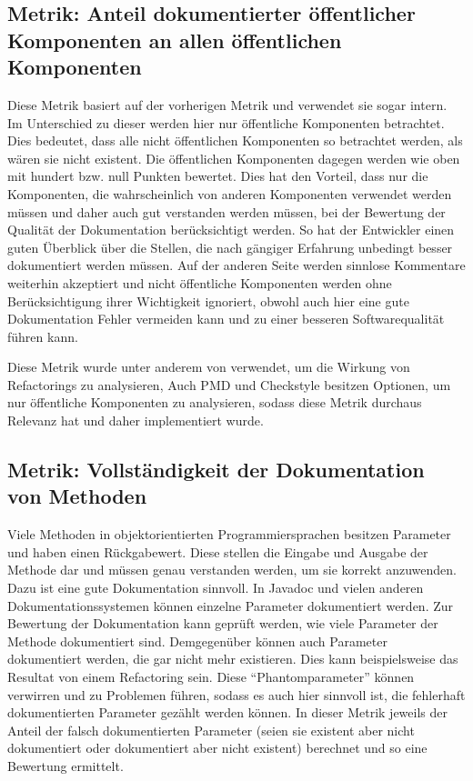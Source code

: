\subsection{Metrik: Anteil dokumentierter öffentlicher Komponenten an allen öffentlichen Komponenten }
Diese Metrik basiert auf der vorherigen Metrik und verwendet sie sogar intern. Im Unterschied zu dieser werden hier nur öffentliche Komponenten betrachtet. Dies bedeutet, dass alle nicht öffentlichen Komponenten so betrachtet werden, als wären sie nicht existent. Die öffentlichen Komponenten dagegen werden wie oben mit hundert bzw. null Punkten bewertet. Dies hat den Vorteil, dass nur die Komponenten, die wahrscheinlich von anderen Komponenten verwendet werden müssen und daher auch gut verstanden werden müssen, bei der Bewertung der Qualität der Dokumentation berücksichtigt werden. So hat der Entwickler einen guten Überblick über die Stellen, die nach gängiger Erfahrung unbedingt besser dokumentiert werden müssen. Auf der anderen Seite werden sinnlose Kommentare weiterhin akzeptiert und nicht öffentliche Komponenten werden ohne Berücksichtigung ihrer Wichtigkeit ignoriert, obwohl auch hier eine gute Dokumentation Fehler vermeiden kann und zu einer besseren Softwarequalität führen kann. 

Diese Metrik wurde unter anderem von \cite{Doautomaticrefactoringsimprovemaintainability?Anindustrialcasestudy} verwendet, um die Wirkung von Refactorings zu analysieren, Auch PMD und Checkstyle besitzen Optionen, um nur öffentliche Komponenten zu analysieren, sodass diese Metrik durchaus Relevanz hat und daher implementiert wurde.

 
 \subsection{Metrik: Vollständigkeit der Dokumentation von  Methoden}
 
Viele Methoden in objektorientierten Programmiersprachen besitzen Parameter und haben einen Rückgabewert. Diese stellen die Eingabe und Ausgabe der Methode dar und müssen genau verstanden werden, um sie korrekt anzuwenden. Dazu ist eine gute Dokumentation sinnvoll. In Javadoc und vielen anderen Dokumentationssystemen können einzelne Parameter dokumentiert werden. Zur Bewertung der Dokumentation kann geprüft werden, wie viele Parameter der Methode dokumentiert sind. Demgegenüber können auch Parameter dokumentiert werden, die gar nicht mehr existieren. Dies kann beispielsweise das Resultat von einem Refactoring sein. Diese \enquote{Phantomparameter} können verwirren und zu Problemen führen, sodass es auch hier sinnvoll ist, die fehlerhaft dokumentierten Parameter gezählt werden können. In dieser Metrik jeweils der Anteil der falsch dokumentierten Parameter (seien sie existent aber nicht dokumentiert oder dokumentiert aber nicht existent) berechnet und so eine Bewertung ermittelt.
 
